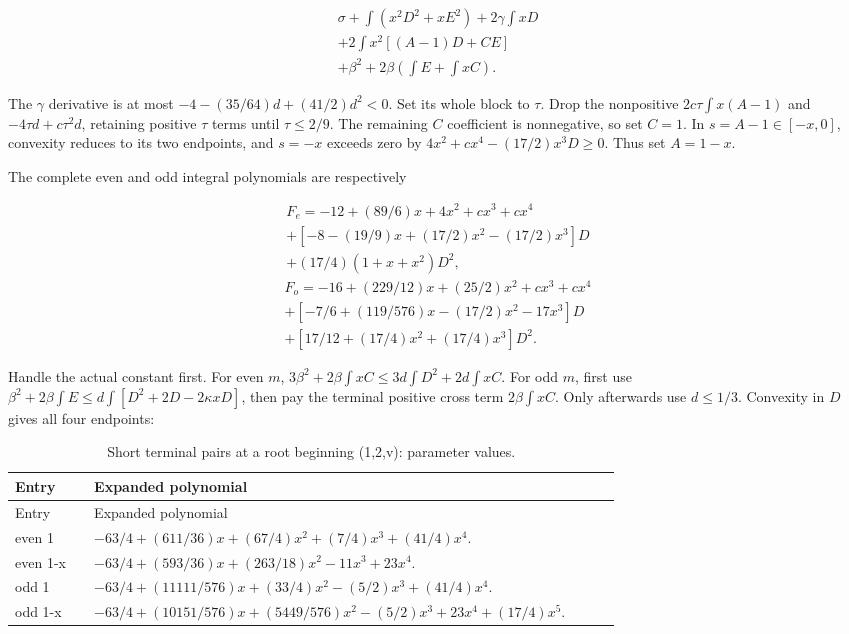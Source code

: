 \[
\begin{gathered}
\sigma+\int(x^2D^2+xE^2)+2\gamma\int xD\\
+2\int x^2[(A-1)D+CE]\\
+\beta^2+2\beta(\int E+\int xC).
\end{gathered}
\]

The \(\gamma\) derivative is at most \(-4-(35/64)d+(41/2)d^2<0\). Set its whole block to \(\tau\). Drop the nonpositive \(2c\tau\int x(A-1)\) and \(-4\tau d+c\tau^2d\), retaining positive \(\tau\) terms until \(\tau\le2/9\). The remaining \(C\) coefficient is nonnegative, so set \(C=1\). In \(s=A-1\in[-x,\allowbreak \allowbreak  0]\), convexity reduces to its two endpoints, and \(s=-x\) exceeds zero by \(4x^2+cx^4-(17/2)x^3D\ge0\). Thus set \(A=1-x\).

The complete even and odd integral polynomials are respectively

\[
\begin{gathered}
F_e=-12+(89/6)x+4x^2+c x^3+c x^4\\
+[-8-(19/9)x+(17/2)x^2-(17/2)x^3]D\\
+(17/4)(1+x+x^2)D^2,
\end{gathered}
\]
\[
\begin{gathered}
F_o=-16+(229/12)x+(25/2)x^2+c x^3+c x^4\\
+[-7/6+(119/576)x-(17/2)x^2-17x^3]D\\
+[17/12+(17/4)x^2+(17/4)x^3]D^2.
\end{gathered}
\]

Handle the actual constant first. For even \(m\), \(3\beta^2+2\beta\int xC\le3d\int D^2+2d\int xC\). For odd \(m\), first use \(\beta^2+2\beta\int E\le d\int[D^2+2D-2\kappa xD]\), then pay the terminal positive cross term \(2\beta\int xC\). Only afterwards use \(d\le1/3\). Convexity in \(D\) gives all four endpoints:


\begingroup\small
\setlength{\tabcolsep}{3pt}
\setlength{\LTleft}{0pt}\setlength{\LTright}{\fill}
\begin{longtable}{@{}p{0.1200\linewidth}p{0.8000\linewidth}@{}}
\caption{Short terminal pairs at a root beginning (1,2,v): parameter values.}\label{tab:parameters:q5-c160:5}\\
\toprule
Entry & Expanded polynomial \\
\midrule\endfirsthead
\toprule
Entry & Expanded polynomial \\
\midrule\endhead
\bottomrule\endfoot
even 1 & \(-63/4+(611/36)x+(67/4)x^2+(7/4)x^3+(41/4)x^4\). \\
\addlinespace[2pt]
even 1-x & \(-63/4+(593/36)x+(263/18)x^2-11x^3+23x^4\). \\
\addlinespace[2pt]
odd 1 & \(-63/4+(11111/576)x+(33/4)x^2-(5/2)x^3+(41/4)x^4\). \\
\addlinespace[2pt]
odd 1-x & \(-63/4+(10151/576)x+(5449/576)x^2-(5/2)x^3+23x^4+(17/4)x^5\). \\
\end{longtable}
\endgroup


